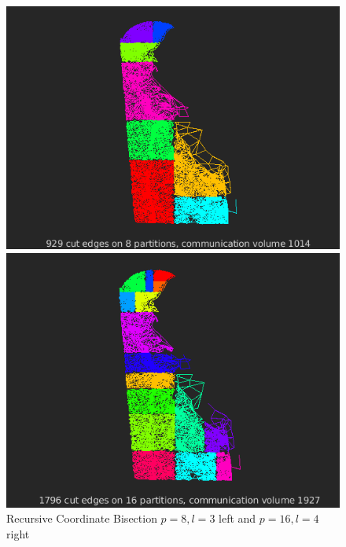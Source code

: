 \documentclass[unicode,11pt,a4paper,oneside,numbers=endperiod,openany]{scrartcl}
\begin{document}
 \begin{figure}[h!]
  \begin{minipage}[c]{0.46\linewidth}
        \centering
        \includegraphics[width=0.8\linewidth]{./img/figure5.png}
    \end{minipage}
    \hfill%
    \begin{minipage}[c]{0.46\linewidth}
        \centering
        \includegraphics[width=0.8\linewidth]{./img/figure6.png}
    \end{minipage}
  \caption{Recursive Coordinate Bisection ${p = 8, l = 3}$ left and ${ p = 16, l = 4}$ right}
  \label{fig:Another tiny Web}
\end{figure}
\end{document}
